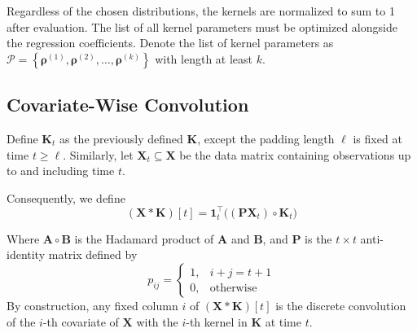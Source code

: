 \documentclass{article}
\begin{document}
	Regardless of the chosen distributions, the kernels are normalized to sum to 1 after evaluation. The list of all kernel parameters must be optimized alongside the regression coefficients. Denote the list of kernel parameters as $\mathcal{P} = \left\{ \boldsymbol{\rho}^{(1)}, \boldsymbol{\rho}^{(2)}, \dots, \boldsymbol{\rho}^{(k)} \right\}$ with length at least $k$. 
	
	
	\newpage
	
	\subsection*{Covariate-Wise Convolution}
	Define $\mathbf{K}_t$ as the previously defined $\mathbf{K}$, except the padding length $\ell$ is fixed at time $t \geq \ell$. Similarly, let $\mathbf{X}_t \subseteq \mathbf{X}$ be the data matrix containing observations up to and including time $t$.
	
	Consequently, we define 
	\begin{equation}
		{(\mathbf{X} \ast \mathbf{K})[t] = {\mathbf{1}}_t^{\top}\big( (\mathbf{P} \mathbf{X}_t ) \circ \mathbf{K}_t\big) }  
	\end{equation}

	Where $\mathbf{A} \circ \mathbf{B}$ is the Hadamard product of $\mathbf{A}$ and $\mathbf{B}$, and $\mathbf{P}$ is the $t \times t$ anti-identity matrix defined by
	$$
	p_{ij} = \begin{cases} 1, & i + j = t+1 \\
		0, &\text{otherwise}\end{cases}
	$$
	By construction, any fixed column $i$ of $(\mathbf{X} \ast \mathbf{K})[t]$ is the discrete  convolution of the $i$-th covariate of $\mathbf{X}$ with the $i$-th kernel in $\mathbf{K}$ at time $t$.
	
\end{document}
